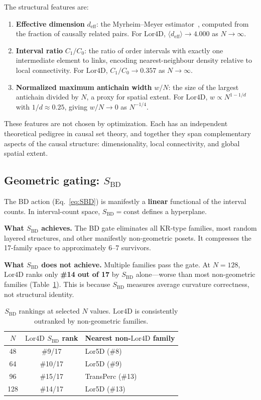 \documentclass[12pt,a4paper]{article}
\newcommand{\SBD}{S_{\mathrm{BD}}}
\newcommand{\deff}{d_{\mathrm{eff}}}
\newcommand{\Lor}{\mathrm{Lor4D}}
\begin{document}
The structural features are:
\begin{enumerate}
\item \textbf{Effective dimension} $\deff$: the Myrheim--Meyer
  estimator~\cite{Myrheim1978,Meyer1988}, computed from the fraction of causally
  related pairs.
  For $\Lor$, $\langle\deff\rangle \to 4.000$ as $N\to\infty$.
\item \textbf{Interval ratio} $C_1/C_0$: the ratio of order intervals with
  exactly one intermediate element to links, encoding nearest-neighbour density
  relative to local connectivity.
  For $\Lor$, $C_1/C_0 \to 0.357$ as $N\to\infty$.
\item \textbf{Normalized maximum antichain width} $w/N$: the size of the largest
  antichain divided by $N$, a proxy for spatial extent.
  For $\Lor$, $w\propto N^{1-1/d}$ with $1/d\approx 0.25$, giving
  $w/N\to 0$ as $N^{-1/4}$.
\end{enumerate}
These features are not chosen by optimization.
Each has an independent theoretical pedigree in causal set theory, and together
they span complementary aspects of the causal structure: dimensionality, local
connectivity, and global spatial extent.

\subsection{\texorpdfstring{Geometric gating: $\SBD$}{Geometric gating: SBD}}

The BD action (Eq.~\ref{eq:SBD}) is manifestly a \textbf{linear} functional of
the interval counts.
In interval-count space, $\SBD = \mathrm{const}$ defines a hyperplane.

\textbf{What $\SBD$ achieves.}
The BD gate eliminates all KR-type families, most random layered structures, and
other manifestly non-geometric posets.
It compresses the 17-family space to approximately 6--7 survivors.

\textbf{What $\SBD$ does not achieve.}
Multiple families pass the gate.
At $N=128$, $\Lor$ ranks only \textbf{\#14 out of 17} by $\SBD$ alone---worse
than most non-geometric families (Table~\ref{tab:sbd_rank}).
This is because $\SBD$ measures average curvature correctness, not structural
identity.

\begin{table}[ht!]
\centering
\caption{$\SBD$ rankings at selected $N$ values. $\Lor$ is consistently
outranked by non-geometric families.}
\label{tab:sbd_rank}
\begin{tabular}{ccl}
\toprule
$N$ & $\Lor$ $\SBD$ rank & Nearest non-$\Lor$ family \\
\midrule
48  & \#9/17  & Lor5D (\#8) \\
64  & \#10/17 & Lor5D (\#9) \\
96  & \#15/17 & TransPerc (\#13) \\
128 & \#14/17 & Lor5D (\#13) \\
\bottomrule
\end{tabular}
\end{table}
\end{document}
